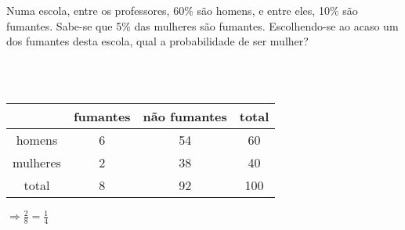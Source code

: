\begin{ex}
Numa escola, entre os professores, 60\% são homens, e entre eles, 10\% são fumantes. Sabe-se que 5\% das mulheres são fumantes. Escolhendo-se ao acaso um dos fumantes desta escola, qual a probabilidade de ser mulher?
  \begin{sol}
    \phantom{A}\\ \\
    \begin{tabular}{|c|c|c|c|} \hline
         & fumantes & não fumantes& total \\  \hline
        homens & 6 & 54 & 60 \\  \hline
        mulheres & 2 & 38 & 40 \\  \hline
        total & 8 & 92 & 100  \\ \hline
    \end{tabular}
    $\Longrightarrow\frac{2}{8}=\frac{1}{4}$
  \end{sol}
\end{ex}